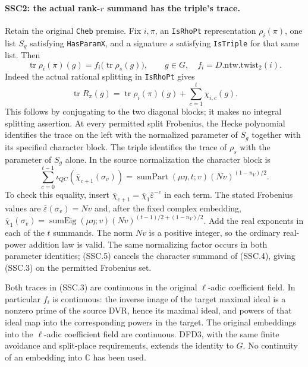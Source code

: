 \documentclass[11pt,a4paper]{article}
\numberwithin{equation}{section}
\theoremstyle{remark}\newtheorem{remark}[theorem]{Remark}
\begin{document}
\paragraph{SSC2: the actual rank-$r$ summand has the triple's trace.}
\label{claim:SSC2}
Retain the original \texttt{Cheb} premise. Fix $i,\pi$, an
\texttt{Is\allowbreak Rho\allowbreak Pt} representation $\rho_i(\pi)$, one list $S_g$
satisfying \texttt{Has\allowbreak Param\allowbreak X}, and a signature $s$ satisfying
\texttt{Is\allowbreak Triple} for that same list. Then
\[
 \operatorname{tr}\rho_i(\pi)(g)
   =f_i\bigl(\operatorname{tr}\rho_s(g)\bigr),\qquad g\in G,
 \quad f_i=D.\mathrm{ntw}.\mathrm{twist}_2(i).                  \tag{SSC.3}
\]
Indeed the actual rational splitting in \texttt{Is\allowbreak Rho\allowbreak Pt} gives
\[
 \operatorname{tr}R_\pi(g)
    =\operatorname{tr}\rho_i(\pi)(g)
       +\sum_{c=1}^{t}\chi_{i,c}(g).                           \tag{SSC.4}
\]
This follows by conjugating to the two diagonal blocks; it makes
no integral splitting assertion. At every permitted split Frobenius,
the Hecke polynomial identifies the trace on the left with the
normalized parameter of $S_g$ together with its specified character
block. The triple identifies the trace of $\rho_s$ with the parameter
of $S_g$ alone. In the source normalization the character block is
\[
 \sum_{c=0}^{t-1}\iota_{QC}(\bar\chi_{c+1}(\sigma_v))
   =\operatorname{sumPart}(\mu\eta,t;v)
          (Nv)^{(1-n_V)/2}.                                   \tag{SSC.5}
\]
To check this equality, insert
$\bar\chi_{c+1}=\bar\chi_1\bar\varepsilon^{-c}$ in each term.
The stated Frobenius values are $\bar\varepsilon(\sigma_v)=Nv$
and, after the fixed complex embedding,
$\bar\chi_1(\sigma_v)=\operatorname{sumEig}(\mu\eta;v)
(Nv)^{(t-1)/2+(1-n_V)/2}$. Add the real exponents in each
of the $t$ summands. The norm $Nv$ is a positive integer,
so the ordinary real-power addition law is valid. The same
normalizing factor occurs in both parameter identities; (SSC.5)
cancels the character summand of (SSC.4), giving (SSC.3) on the
permitted Frobenius set.

Both traces in (SSC.3) are continuous in the original $\ell$-adic
coefficient field. In particular $f_i$ is continuous: the inverse
image of the target maximal ideal is a nonzero prime of the source
DVR, hence its maximal ideal, and powers of that ideal map into
the corresponding powers in the target. The original embeddings
into the $\ell$-adic coefficient field are continuous. DFD3, with
the same finite avoidance and split-place requirements, extends the
identity to $G$. No continuity of an embedding into $\mathbb C$
has been used.
\end{document}
